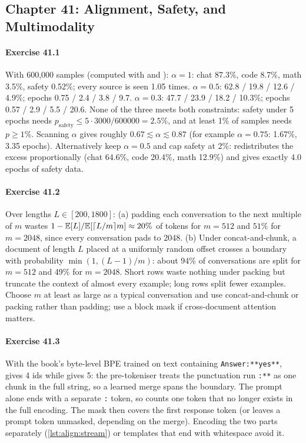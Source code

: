 \subsection*{Chapter 41: Alignment, Safety, and Multimodality}
\begingroup\sloppy

\paragraph{Exercise 41.1} With 600{,}000 samples (computed with  and
):
$\alpha=1$: chat 87.3\%, code 8.7\%, math 3.5\%, safety 0.52\%; every source is seen 1.05 times.
$\alpha=0.5$: 62.8 / 19.8 / 12.6 / 4.9\%; epochs 0.75 / 2.4 / 3.8 / 9.7.
$\alpha=0.3$: 47.7 / 23.9 / 18.2 / 10.3\%; epochs 0.57 / 2.9 / 5.5 / 20.6.
None of the three meets both constraints: safety under 5 epochs needs $p_{\text{safety}}\le 5\cdot3000/600000=2.5\%$, and at least 1\%
of samples needs $p\ge1\%$. Scanning $\alpha$ gives roughly $0.67\lesssim\alpha\lesssim0.87$
(for example $\alpha=0.75$: 1.67\%, 3.35 epochs). Alternatively keep $\alpha=0.5$ and cap safety at 2\%:
 redistributes the excess proportionally (chat 64.6\%, code 20.4\%, math 12.9\%)
and gives exactly 4.0 epochs of safety data.

\paragraph{Exercise 41.2} Over lengths $L\in[200,1800]$: (a) padding each conversation to the next
multiple of $m$ wastes $1-\mathbb{E}[L]/\mathbb{E}[\lceil L/m\rceil m]\approx20\%$ of tokens for $m=512$ and $51\%$
for $m=2048$, since every conversation pads to 2048. (b) Under concat-and-chunk, a document of length $L$
placed at a uniformly random offset crosses a boundary with probability $\min(1,(L-1)/m)$: about
94\% of conversations are split for $m=512$ and 49\% for $m=2048$. Short rows waste nothing under
packing but truncate the context of almost every example; long rows split fewer examples. Choose
$m$ at least as large as a typical conversation and use concat-and-chunk or packing rather than
padding; use a block mask if cross-document attention matters.

\paragraph{Exercise 41.3} With the book's byte-level BPE trained on text containing \texttt{Answer:**yes**},
 gives 4 ids while  gives 5:
the pre-tokeniser treats the punctuation run \texttt{:**} as one chunk in the full string, so a learned
merge spans the boundary. The prompt alone ends with a separate \texttt{:} token, so
 counts one token that no longer exists in the full encoding. The mask then
covers the first response token (or leaves a prompt token unmasked, depending on the merge). Encoding the
two parts separately (\cref{lst:align:stream}) or templates that end with whitespace avoid it.

